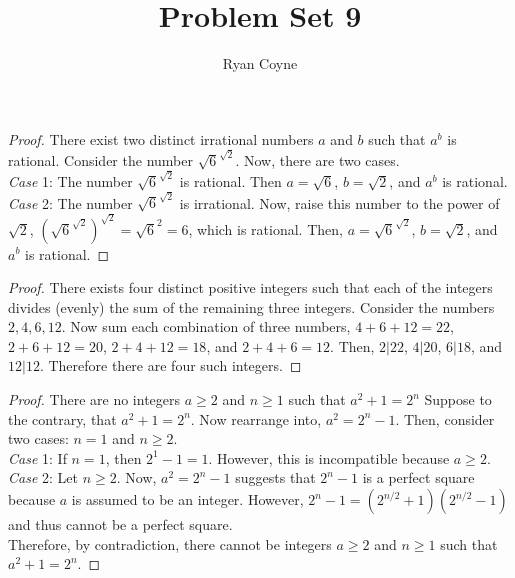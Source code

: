 \documentclass[12pt]{article}
\begin{document}
    \title{Problem Set 9}
    \author{Ryan Coyne}
    \maketitle

    \noindent\begin{proof}{There exist two distinct irrational numbers \(a\) and \(b\) such that \(a^b\) is rational.}
        Consider the number \(\sqrt{6}^{\sqrt{2}}\). Now, there are two cases.\\
        \textit{Case} 1: The number \(\sqrt{6}^{\sqrt{2}}\) is rational. Then \(a=\sqrt6\), \(b=\sqrt2\), and \(a^b\) is rational. \\
        \textit{Case} 2: The number \(\sqrt{6}^{\sqrt{2}}\) is irrational. Now, raise this number to the power of \(\sqrt2\), \((\sqrt{6}^{\sqrt{2}})^{\sqrt2}=\sqrt{6}^2=6\), which is rational. Then, \(a=\sqrt{6}^{\sqrt{2}}\), \(b=\sqrt2\), and \(a^b\) is rational. 
    \end{proof}
    \vspace{12pt}
    \begin{proof}{There exists four distinct positive integers such that each of the integers divides (evenly) the sum of the remaining three integers.}
            Consider the numbers \(2,4,6,12\). Now sum each combination of three numbers, \(4+6+12=22\), \(2+6+12=20\), \(2+4+12=18\), and \(2+4+6=12\). Then,  \(2|22\), \(4|20\), \(6|18\), and \(12|12\). Therefore there are four such integers.
    \end{proof}
    \vspace{12pt}    
    \begin{proof}{There are no integers \(a\geq2\) and \(n\geq1\) such that \(a^2+1=2^n\)}
        Suppose to the contrary, that \(a^2+1=2^n\). Now rearrange into, \(a^2 = 2^n-1\).
        Then, consider two cases: \(n=1\) and \(n\geq2\). \\ \textit{Case} 1: If \(n=1\), then \(2^1-1=1\). However, this is incompatible because \(a\geq2\). \\ \textit{Case} 2: Let \(n\geq2\). Now, \(a^2=2^n-1\) suggests that \(2^n-1\) is a perfect square because \(a\) is assumed to be an integer. However, \(2^n-1=(2^{n/2}+1)(2^{n/2}-1)\) and thus cannot be a perfect square.\\ Therefore, by contradiction, there cannot be integers \(a\geq2\) and \(n\geq1\) such that \(a^2+1=2^n\).
    \end{proof}
    \vspace{12pt}
\end{document}
